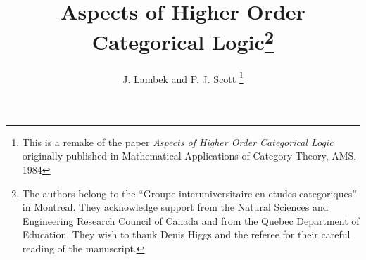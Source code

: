 \newcommand{\iso}{\cong}                %
\newcommand{\eqv}{\simeq}               %
\newcommand{\sub}{\subseteq}            %

\usepackage{amsmath,amsthm}

\theoremstyle{definition}

\newtheorem{thm}{Theorem}[section]
\newtheorem{lemma}[thm]{Lemma}
\newtheorem{prop}[thm]{Proposition}
\newtheorem{cor}[thm]{Corollary}
\newtheorem{defn}[thm]{Definition}
\newtheorem{example}[thm]{Example}
\newtheorem{remark}[thm]{Remark}
\newtheorem{note}[thm]{Note}

\makeatletter
\DeclareRobustCommand{\eqx}{\mathrel{\mathpalette\eq@{X}}}
\DeclareRobustCommand{\eqlx}{\mathrel{\mathpalette\eq@{x}}}
\DeclareRobustCommand{\eqy}{\mathrel{\mathpalette\eq@{Y}}}
\DeclareRobustCommand{\eqxx}{\mathrel{\mathpalette\eq@{X \union \{x\}}}}
\DeclareRobustCommand{\eqtx}{\mathrel{\mathpalette\eq@{\trans(X)}}}
\newcommand{\eq@}[2]{%
  \vtop{\offinterlineskip
    \ialign{\hfil##\hfil\cr
      $\m@th#1=$\cr %
      \noalign{\sbox\z@{$\m@th#1\mkern0mu$}\kern-\wd\z@}
      $\m@th\alexey@demote{#1}#2$\cr
    }%
  }%
}
\DeclareRobustCommand{\eqdX}{\mathrel{\mathpalette\eqd@{X}}}
\DeclareRobustCommand{\eqdx}{\mathrel{\mathpalette\eqd@{x}}}
\newcommand{\eqd@}[2]{%
  \vtop{\offinterlineskip
    \ialign{\hfil##\hfil\cr
      $\m@th#1\deqd$\cr %
      \noalign{\sbox\z@{$\m@th#1\mkern0mu$}\kern-\wd\z@}
      $\m@th\alexey@demote{#1}#2$\cr
    }%
  }%
}
\newcommand{\alexey@demote}[1]{%
  \ifx#1\displaystyle\scriptstyle\else
  \ifx#1\textstyle\scriptstyle\else
  \scriptscriptstyle\fi\fi
}

\makeatother

\usepackage{footmisc}

\makeatletter
\let\original@footnotemark\footnotemark
\newcommand{\align@footnotemark}{%
  \ifmeasuring@
    \chardef\@tempfn=\value{footnote}%
    \original@footnotemark
    \setcounter{footnote}{\@tempfn}%
  \else
    \iffirstchoice@
      \original@footnotemark
    \fi
  \fi}
\pretocmd{\start@align}{\let\footnotemark\align@footnotemark}{}{}
\makeatother

\makeatletter
\newcommand*\dotop{\mathpalette\bigcdot@{.6}}
\newcommand*\bigcdot@[2]{\mathbin{\vcenter{\hbox{\scalebox{#2}{$\m@th#1\bullet$}}}}}
\makeatother

\title{\large Aspects of Higher Order Categorical Logic\footnote{The authors belong to the ``Groupe interuniversitaire en etudes categoriques'' in Montreal. They acknowledge support from the Natural Sciences and
Engineering Research Council of Canada and from the Quebec Department of
Education. They wish to thank Denis Higgs and the referee for their careful
reading of the manuscript.}}
\author{\normalsize J. Lambek and P. J. Scott%
\footnote{This is a remake of the paper {\em Aspects of Higher Order Categorical Logic}
originally published in Mathematical Applications of Category Theory, AMS, 1984} 
}

